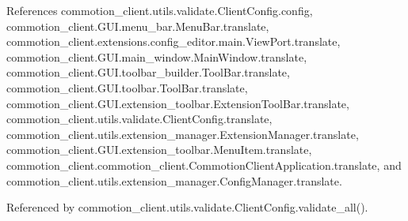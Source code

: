 References commotion\-\_\-client.\-utils.\-validate.\-Client\-Config.\-config, commotion\-\_\-client.\-G\-U\-I.\-menu\-\_\-bar.\-Menu\-Bar.\-translate, commotion\-\_\-client.\-extensions.\-config\-\_\-editor.\-main.\-View\-Port.\-translate, commotion\-\_\-client.\-G\-U\-I.\-main\-\_\-window.\-Main\-Window.\-translate, commotion\-\_\-client.\-G\-U\-I.\-toolbar\-\_\-builder.\-Tool\-Bar.\-translate, commotion\-\_\-client.\-G\-U\-I.\-toolbar.\-Tool\-Bar.\-translate, commotion\-\_\-client.\-G\-U\-I.\-extension\-\_\-toolbar.\-Extension\-Tool\-Bar.\-translate, commotion\-\_\-client.\-utils.\-validate.\-Client\-Config.\-translate, commotion\-\_\-client.\-utils.\-extension\-\_\-manager.\-Extension\-Manager.\-translate, commotion\-\_\-client.\-G\-U\-I.\-extension\-\_\-toolbar.\-Menu\-Item.\-translate, commotion\-\_\-client.\-commotion\-\_\-client.\-Commotion\-Client\-Application.\-translate, and commotion\-\_\-client.\-utils.\-extension\-\_\-manager.\-Config\-Manager.\-translate.



Referenced by commotion\-\_\-client.\-utils.\-validate.\-Client\-Config.\-validate\-\_\-all().


